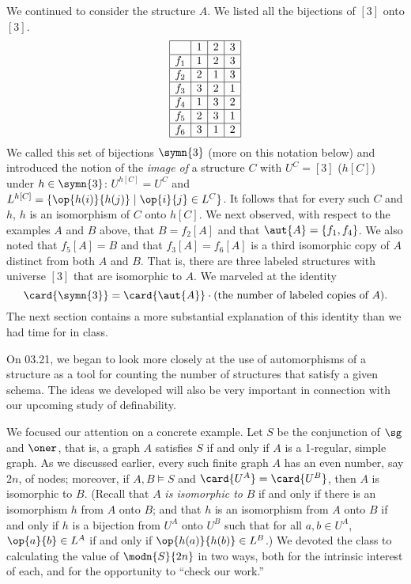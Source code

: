 We continued to consider the structure $A$. We listed all the bijections of $[3]$ onto $[3]$.
\[
\begin{array}{|c|c|c|c|}
\hline
 &1&2&3\\
\hline
f_1&1&2&3\\
\hline
f_2&2&1&3\\
\hline
f_3&3&2&1\\
\hline
f_4&1&3&2\\
\hline
f_5&2&3&1\\
\hline
f_6&3&1&2\\
\hline

\end{array}
\]
We called this set of bijections $\symn{3}$ (more on this notation below) and introduced the notion of the \emph{image of} a structure $C$ with $U^C=[3]$ ($h[C]$) under $h\in\symn{3}$: $U^{h[C]}=U^C$ and $L^{h[C]}=\{\op{h(i)}{h(j)}\mid\op{i}{j}\in L^C\}$. It follows that for every such $C$ and $h$, $h$ is an isomorphism of $C$ onto $h[C]$. We next observed, with respect to the examples $A$ and $B$ above, that $B=f_2[A]$ and that $\aut{A}=\{f_1,f_4\}$. We also noted that $f_5[A]=B$ and that $f_3[A]=f_6[A]$ is a third isomorphic copy of $A$ distinct from both $A$ and $B$. That is, there are three labeled structures with universe $[3]$ that are isomorphic to $A$. We marveled at the identity 
\begin{equation}\label{ose-eq}
\card{\symn{3}}=\card{\aut{A}}\cdot (\mbox{the number of labeled copies of }A).
\end{equation}
 The next section contains a more substantial explanation of this identity than we had time for in class.
\iffalse

On 03.21, we began to look more closely at the use of automorphisms of a structure as a tool for counting the number of structures that satisfy a given schema. The ideas we developed will also be very important in connection with our upcoming study of definability.

We focused our attention on a concrete example. Let $S$ be the conjunction of $\sg$ and $\oner$, that is, a graph $A$ satisfies $S$ if and only if $A$ is a 1-regular, simple graph. As we discussed earlier, every such finite graph $A$ has an even number, say $2n$, of nodes; moreover, if $A,B\models S$ and $\card{U^A}=\card{U^B}$, then $A$ is isomorphic to $B$. (Recall that $A$ \emph{is isomorphic to} $B$ if and only if there is an isomorphism $h$ from $A$ onto $B$; and that $h$ is an isomorphism from $A$ onto $B$ if and only if $h$ is a bijection from $U^A$ onto $U^B$ such that for all $a,b\in U^A$, $\op{a}{b}\in L^A$ if and only if $\op{h(a)}{h(b)}\in L^B$.) We devoted the class to calculating the value of $\modn{S}{2n}$ in two ways, both for the intrinsic interest of each, and for the opportunity to ``check our work.''

